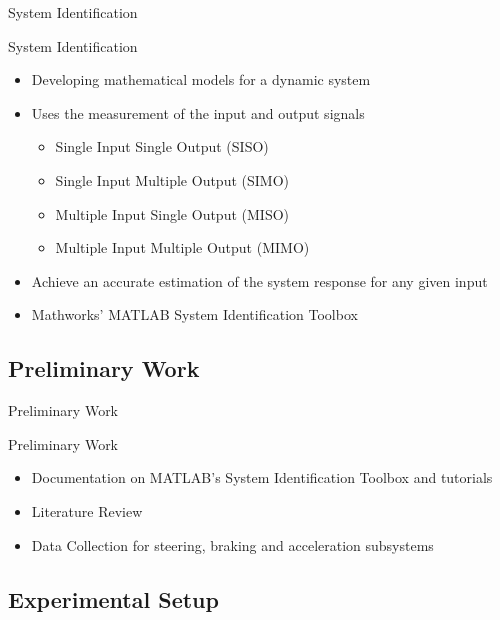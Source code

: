 \documentclass{beamer}
\begin{document}
\begin{frame}{System Identification}
  \begin{block}{System Identification}
 \begin{itemize}
        \item Developing mathematical models for a dynamic system
        \item Uses the measurement of the input and output signals
        \begin{itemize}
        		\item Single Input Single Output (SISO)
        		\item Single Input Multiple Output (SIMO)
        		\item Multiple Input Single Output (MISO)
        		\item Multiple Input Multiple Output (MIMO)
        \end{itemize}
        \item Achieve an accurate estimation of the system response for any given input
        \item Mathworks' MATLAB System Identification Toolbox
\end{itemize}
  \end{block}
\end{frame}

\subsection{Preliminary Work}

\begin{frame}{Preliminary Work}
  \begin{block}{Preliminary Work}
 \begin{itemize}
        \item Documentation on MATLAB's System Identification Toolbox and tutorials
        \item Literature Review 
        \item Data Collection for steering, braking and acceleration subsystems
\end{itemize}
  \end{block}
\end{frame}

\subsection{Experimental Setup}
\end{document}

